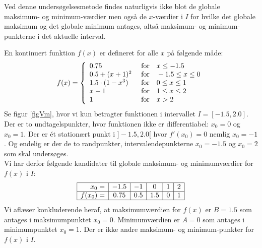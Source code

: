 \begin{think}
Ved denne undersøgelsesmetode findes naturligvis ikke blot de globale maksimum- og minimum-værdier men også de $x$-værdier i $I$ for hvilke
det globale maksimum og det globale minimum antages, altså maksimum- og minimum-punkterne i det aktuelle interval.
\end{think}


\begin{example} \label{exampKontFunk}
En kontinuert funktion $f(x)$ er defineret for alle $x$ på følgende måde:
\begin{equation}
f(x) = \left\{
        \begin{array}{ll}
         0.75 \, \,  & \hbox{for} \quad x \leq -1.5 \\
           0.5 + (x+1)^{2} \, \,  & \hbox{for} \quad -1.5 \leq x \leq 0  \\
           1.5\cdot(1-x^{3}) \, \,  & \hbox{for} \quad 0 \leq x \leq 1  \\
              x-1 \, \,  & \hbox{for} \quad 1 \leq x \leq 2  \\
          1 \, \, & \hbox{for} \quad x > 2
        \end{array}
      \right.
\end{equation}
Se figur \ref{figVm}, hvor vi kun betragter funktionen i intervallet $I = [-1.5, 2.0]$.
Der er to undtagelspunkter, hvor funktionen ikke er differentiabel: $x_{0}=0$ og $x_{0}=1$.
Der er \'{e}t stationært punkt i $]-1.5, 2.0[$ hvor $f'(x_{0}) = 0$ nemlig $x_{0}= -1$.
Og endelig er der de to randpunkter, intervalendepunkterne $x_{0}=-1.5$ og $x_{0}=2$ som skal undersøges.\\

Vi har derfor følgende kandidater til globale maksimum- og minimumværdier for $f(x)$ i $I$:
\begin{equation}
\begin{array}{|r|c|c|c|c|c|}
  \hline
  x_{0} =  & -1.5 & -1 & 0 & 1 & 2\\ \hline
  f(x_{0}) =  & 0.75 & 0.5 & 1.5 & 0 & 1 \\
  \hline
\end{array}
\end{equation}
Vi aflæser konkluderende heraf, at maksimumværdien for $f(x)$ er $B = 1.5$ som antages i maksimumpunktet $x_{0} =0$. Minimumværdien er $A = 0$ som antages i minimumpunktet $x_{0}= 1$. Der er ikke andre maksimum- og minimum-punkter for $f(x)$ i $I$.
\end{example}



